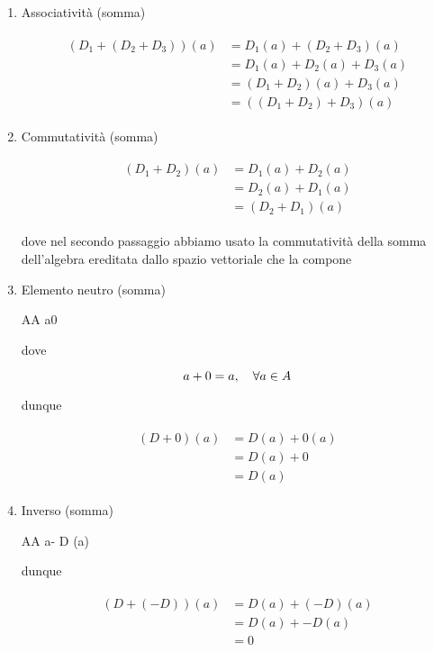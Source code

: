 \begin{enumerate}
	\item Associatività (somma)
	
	\begin{align}
		\begin{split}
			( D_{1} + (D_{2} + D_{3}) ) (a) &= D_{1} (a) + (D_{2} + D_{3}) (a)\\
			&= D_{1} (a) + D_{2} (a) + D_{3} (a)\\
			&= (D_{1} + D_{2}) (a) + D_{3} (a)\\
			&= ( (D_{1} + D_{2}) + D_{3} ) (a)
		\end{split}
	\end{align}
	
	\item Commutatività (somma)
	
	\begin{align}
		\begin{split}
			(D_{1} + D_{2}) (a) &= D_{1} (a) + D_{2} (a)\\
			&= D_{2} (a) + D_{1} (a)\\
			&= (D_{2} + D_{1}) (a)
		\end{split}
	\end{align}
	
	dove nel secondo passaggio abbiamo usato la commutatività della somma dell'algebra ereditata dallo spazio vettoriale che la compone
	
	\item Elemento neutro (somma)
	
		{A}{A}
		{a}{0}
	
	dove
	
	\begin{equation}
		a + 0 = a \qcomma \forall a \in A
	\end{equation}
	
	dunque
	
	\begin{align}
		\begin{split}
			(D + 0) (a) &= D (a) + 0 (a)\\
			&= D (a) + 0\\
			&= D (a)
		\end{split}
	\end{align}
	
	\item Inverso (somma)
	
		{A}{A}
		{a}{- D (a)}
	
	dunque
	
	\begin{align}
		\begin{split}
			(D + (- D)) (a) &= D (a) + (- D) (a)\\
			&= D (a) + - D (a)\\
			&= 0
		\end{split}
	\end{align}
	

\end{enumerate}
